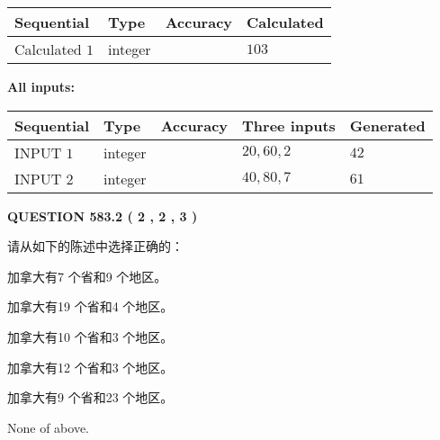 \documentclass{ctexart}
\begin{document}
   
   
   
\noindent{}
   
   
  
  
\noindent\begin{tabular}{|l|l|l|l|}
\hline
 Sequential & Type & Accuracy & Calculated \\ 
\hline
 
 
  Calculated $  1 $ & integer &  & 
  $ 103 $ 
 \\  \hline  
 \end{tabular}
   
   
   
   
\noindent\vspace{0.1in}\hspace{-0.08in} {\textbf{\Large{All inputs: }}}
   
   
  
  
\noindent\begin{tabular}{|l|l|l|l|l|}
\hline
 Sequential & Type & Accuracy & Three inputs & Generated \\ 
\hline
 
 
  INPUT $  1 $ & integer &  & $
 20
 , 
 60
 , 
 2
 $ & $ 42 $ 
 \\  \hline  
 
 
  INPUT $  2 $ & integer &  & $
 40
 , 
 80
 , 
 7
 $ & $ 61 $ 
 \\  \hline  
 \end{tabular}
   
   
  
\vspace{0.2in}
  
{\textbf{\Large{QUESTION
583.2 
 ( 2 , 2 , 3 )
}}}
  
  
请从如下的陈述中选择正确的：
 
 
加拿大有7 个省和9 个地区。
 
 
加拿大有19 个省和4 个地区。
 
 
加拿大有10 个省和3 个地区。
 
 
加拿大有12 个省和3 个地区。
 
 
加拿大有9 个省和23 个地区。
 
 
 None of above.
 
 
\noindent{}
 
\end{document}
